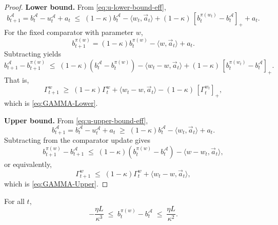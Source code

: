\begin{proof}
\textbf{Lower bound.}  
From \eqref{eq:u-lower-bound-eff},
\[
b_{t+1}^\mathcal{A}
= b_t^\mathcal{A} - u_t^\mathcal{A} + a_t
\;\le\;
(1-\kappa)b_t^\mathcal{A} - \langle w_t,\vec{a}_t\rangle
+ (1-\kappa)\,[b_t^{\pi(w_t)}-b_t^\mathcal{A}]_+ + a_t .
\]
For the fixed comparator with parameter \(w\),
\[
b_{t+1}^{\pi(w)} = (1-\kappa)b_t^{\pi(w)} - \langle w,\vec{a}_t\rangle + a_t .
\]
Subtracting yields
\[
b_{t+1}^\mathcal{A} - b_{t+1}^{\pi(w)}
\;\le\;
(1-\kappa)(b_t^\mathcal{A}-b_t^{\pi(w)})
-\langle w_t - w,\vec{a}_t\rangle
+(1-\kappa)\,[b_t^{\pi(w_t)}-b_t^\mathcal{A}]_+ .
\]
That is,
\[
\Gamma_{t+1}^w
\;\ge\;
(1-\kappa)\Gamma_t^w
+\langle w_t - w,\vec{a}_t\rangle
-(1-\kappa)\,[\Gamma_t^{w_t}]_+,
\]
which is \eqref{eq:GAMMA-Lower}.

\medskip
\noindent
\textbf{Upper bound.}  
From \eqref{eq:u-upper-bound-eff},
\[
b_{t+1}^\mathcal{A}
= b_t^\mathcal{A} - u_t^\mathcal{A} + a_t
\;\ge\;
(1-\kappa)b_t^\mathcal{A} - \langle w_t,\vec{a}_t\rangle + a_t .
\]
Subtracting from the comparator update gives
\[
b_{t+1}^{\pi(w)} - b_{t+1}^\mathcal{A}
\;\le\;
(1-\kappa)(b_t^{\pi(w)}-b_t^\mathcal{A})
-\langle w - w_t,\vec{a}_t\rangle ,
\]
or equivalently,
\[
\Gamma_{t+1}^w
\;\le\;
(1-\kappa)\Gamma_t^w
+\langle w_t - w,\vec{a}_t\rangle ,
\]
which is \eqref{eq:GAMMA-Upper}.
\end{proof}


\begin{Thm:Lemma}
\label{lem:state-gap-bound}
For all \(t\),
\[
-\frac{\eta L}{\kappa^3}
\;\leq\;
b_t^{\pi(w)} - b_t^\mathcal{A}
\;\leq\;
\frac{\eta L}{\kappa^2}.
\]
\end{Thm:Lemma}

